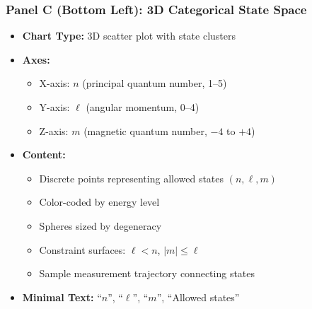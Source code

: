 \subsubsection*{Panel C (Bottom Left): 3D Categorical State Space}
\begin{itemize}
\item \textbf{Chart Type:} 3D scatter plot with state clusters
\item \textbf{Axes:}
  \begin{itemize}
  \item X-axis: $n$ (principal quantum number, 1--5)
  \item Y-axis: $\ell$ (angular momentum, 0--4)
  \item Z-axis: $m$ (magnetic quantum number, $-4$ to $+4$)
  \end{itemize}
\item \textbf{Content:}
  \begin{itemize}
  \item Discrete points representing allowed states $(n,\ell,m)$
  \item Color-coded by energy level
  \item Spheres sized by degeneracy
  \item Constraint surfaces: $\ell < n$, $|m| \leq \ell$
  \item Sample measurement trajectory connecting states
  \end{itemize}
\item \textbf{Minimal Text:} ``$n$'', ``$\ell$'', ``$m$'', ``Allowed states''
\end{itemize}

